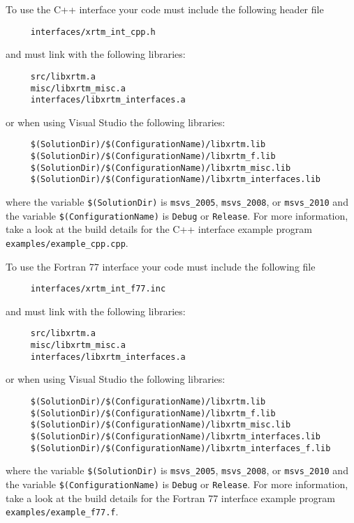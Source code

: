 \label{building_and_using_xrtm_using_xrtm_in_your_code_cpp}

To use the C++ interface your code must include the following header file
\begin{verbatim}
     interfaces/xrtm_int_cpp.h
\end{verbatim}
and must link with the following libraries:
\begin{verbatim}
     src/libxrtm.a
     misc/libxrtm_misc.a
     interfaces/libxrtm_interfaces.a
\end{verbatim}
or when using Visual Studio the following libraries:
\begin{verbatim}
     $(SolutionDir)/$(ConfigurationName)/libxrtm.lib
     $(SolutionDir)/$(ConfigurationName)/libxrtm_f.lib
     $(SolutionDir)/$(ConfigurationName)/libxrtm_misc.lib
     $(SolutionDir)/$(ConfigurationName)/libxrtm_interfaces.lib
\end{verbatim}
where the variable \texttt{\$(SolutionDir)} is \texttt{msvs\_2005}, \texttt{msvs\_2008}, or \texttt{msvs\_2010} and the variable \texttt{\$(ConfigurationName)} is \texttt{Debug} or \texttt{Release}.  For more information, take a look at the build details for the C++ interface example program \texttt{examples/example\_cpp.cpp}.


\label{building_and_using_xrtm_using_xrtm_in_your_code_fortran_77}

To use the Fortran 77 interface your code must include the following file
\begin{verbatim}
     interfaces/xrtm_int_f77.inc
\end{verbatim}
and must link with the following libraries:
\begin{verbatim}
     src/libxrtm.a
     misc/libxrtm_misc.a
     interfaces/libxrtm_interfaces.a
\end{verbatim}
or when using Visual Studio the following libraries:
\begin{verbatim}
     $(SolutionDir)/$(ConfigurationName)/libxrtm.lib
     $(SolutionDir)/$(ConfigurationName)/libxrtm_f.lib
     $(SolutionDir)/$(ConfigurationName)/libxrtm_misc.lib
     $(SolutionDir)/$(ConfigurationName)/libxrtm_interfaces.lib
     $(SolutionDir)/$(ConfigurationName)/libxrtm_interfaces_f.lib
\end{verbatim}
where the variable \texttt{\$(SolutionDir)} is \texttt{msvs\_2005}, \texttt{msvs\_2008}, or \texttt{msvs\_2010} and the variable \texttt{\$(ConfigurationName)} is \texttt{Debug} or \texttt{Release}.  For more information, take a look at the build details for the Fortran 77 interface example program \texttt{examples/example\_f77.f}.


